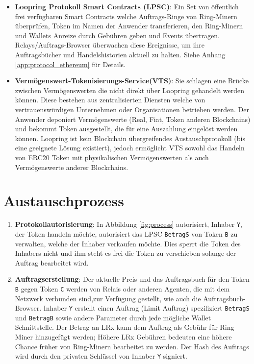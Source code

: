 \documentclass[UTF8,nofonts]{article}
\begin{document}
\begin{multicols}{2}
\begin{itemize}
\item \textbf{Loopring Protokoll Smart Contracts (LPSC)}: Ein Set von öffentlich frei verfügbaren Smart Contracts welche Auftrags-Ringe von Ring-Minern überprüfen, Token im Namen der Anwender transferieren, den Ring-Minern und Wallets Anreize durch Gebühren geben und Events übertragen. Relays/Auftrags-Browser überwachen diese Ereignisse, um ihre Auftragsbücher und Handelshistorien aktuell zu halten. Siehe Anhang \ref{app:protocol_ethereum} für Details.

\item \textbf{Vermögenswert-Tokenisierungs-Service(VTS)}: Sie schlagen eine Brücke zwischen Vermögenswerten die nicht direkt über Loopring gehandelt werden können. Diese bestehen aus zentralisierten Diensten welche von vertrauenswürdigen Unternehmen oder Organisationen betrieben werden. Der Anwender deponiert Vermögenswerte (Real, Fiat, Token anderen Blockchains) und bekommt Token ausgestellt, die für eine Auszahlung eingelöst werden können. Loopring ist kein Blockchain übergreifendes Austauschprotokoll (bis eine geeignete Lösung existiert), jedoch ermöglicht VTS sowohl das Handeln von ERC20 Token \cite{ERC20} mit physikalischen Vermögenswerten als auch Vermögenswerte anderer Blockchains.

\end{itemize}


\section{Austauschprozess\label{sec:process}}



\begin{enumerate} 


\item \textbf{Protokollautorisierung}: In Abbildung \ref{fig:process} autorisiert, Inhaber \verb|Y|, der Token handeln möchte, autorisiert das LPSC \verb|BetragS| von Token \verb|B| zu verwalten, welche der Inhaber verkaufen möchte. Dies sperrt die Token des Inhabers nicht und ihm steht es frei die Token zu verschieben solange der Auftrag bearbeitet wird.

\item \textbf{Auftragserstellung}: Der aktuelle Preis und das Auftragsbuch für den Token \verb|B| gegen Token \verb|C| werden von Relais oder anderen Agenten, die mit dem Netzwerk verbunden sind,zur Verfügung gestellt, wie auch die Auftragsbuch-Browser. Inhaber \verb|Y| erstellt einen Auftrag (Limit Auftrag) spezifiziert \verb|BetragS| und \verb|BetragB| sowie andere Parameter durch jede mögliche Wallet Schnittstelle. Der Betrag an LRx kann dem Auftrag als Gebühr für Ring-Miner hinzugefügt werden; Höhere LRx Gebühren bedeuten eine höhere Chance früher von Ring-Minern bearbeitet zu werden. Der Hash des Auftrags wird durch den privaten Schlüssel von Inhaber \verb|Y| signiert.


\end{enumerate}
\end{multicols}
\end{document}
